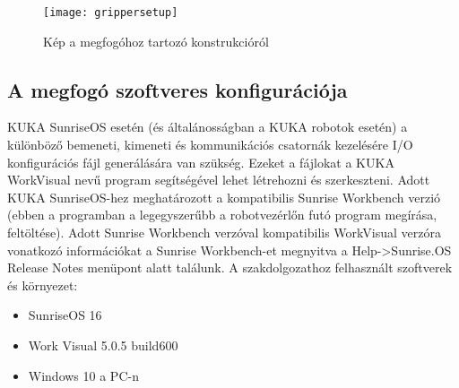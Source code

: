 \documentclass[../documentation.tex]{subfiles}
\begin{document}
\begin{figure}
\centering
\texttt{[image: grippersetup]}
\caption{Kép a megfogóhoz tartozó konstrukcióról}
\label{fig:grippersetup}
\end{figure}

\subsection{A megfogó szoftveres konfigurációja}
KUKA SunriseOS esetén (és általánosságban a KUKA robotok esetén) a különböző bemeneti, kimeneti és kommunikációs csatornák kezelésére I/O konfigurációs fájl generálására van szükség. Ezeket a fájlokat a KUKA WorkVisual nevű program segítségével lehet létrehozni és szerkeszteni. Adott KUKA SunriseOS-hez meghatározott a kompatibilis Sunrise Workbench verzió (ebben a programban a legegyszerűbb a robotvezérlőn futó program megírása, feltöltése). Adott Sunrise Workbench verzóval kompatibilis WorkVisual verzóra vonatkozó információkat a Sunrise Workbench-et megnyitva a Help->Sunrise.OS Release Notes menüpont alatt találunk. A szakdolgozathoz felhasznált szoftverek és környezet:
\begin{itemize}
	\item SunriseOS 16
	\item Work Visual 5.0.5 build600
	\item Windows 10 a PC-n
\end{itemize}
\end{document}
